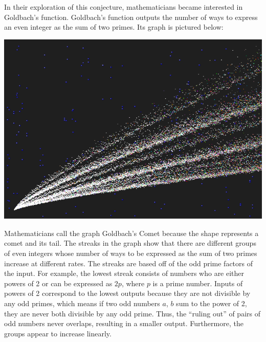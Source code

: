 \documentclass{article}
\begin{document}
In their exploration of this conjecture, mathematicians became interested in Goldbach’s function. Goldbach’s function outputs the number of ways to express an even integer as the sum of two primes. Its graph is pictured below:
\begin{center}
    \includegraphics[scale=0.4]{images/goldbach-comet.png}
\end{center}
Mathematicians call the graph Goldbach’s Comet because the shape represents a comet and its tail. The streaks in the graph show that there are different groups of even integers whose number of ways to be expressed as the sum of two primes increase at different rates. The streaks are based off of the odd prime factors of the input. For example, the lowest streak consists of numbers who are either powers of 2 or can be expressed as $2p$, where $p$ is a prime number. Inputs of powers of 2 correspond to the lowest outputs because they are not divisible by any odd primes, which means if two odd numbers $a$, $b$ sum to the power of 2, they are never both divisible by any odd prime. Thus, the “ruling out” of pairs of odd numbers never overlaps, resulting in a smaller output. Furthermore, the groups appear to increase linearly.
\end{document}
